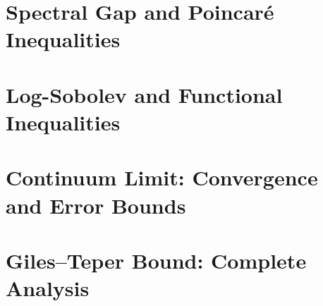 \documentclass[11pt,a4paper]{report}
\begin{document}
\chapter{Spectral Gap and Poincar\'e Inequalities}
\label{ch:spectral-gap}







\chapter{Log-Sobolev and Functional Inequalities}
\label{ch:log-sobolev}





\chapter{Continuum Limit: Convergence and Error Bounds}
\label{ch:continuum-appendix}







\chapter{Giles--Teper Bound: Complete Analysis}
\label{ch:giles-teper}



\end{document}
